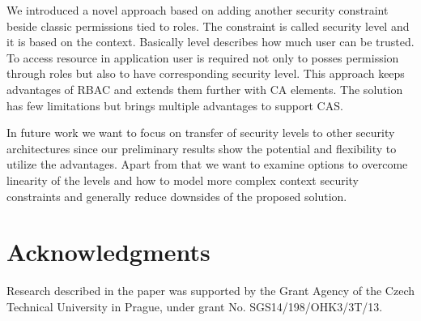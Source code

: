 \documentclass{sig-alternate}
\begin{document}
We introduced a novel approach based on adding another security constraint beside classic permissions tied to roles. The constraint is called security level and it is based on the context. Basically level describes how much user can be trusted. To access resource in application user is required not only to posses permission through roles but also to have corresponding security level. This approach keeps advantages of RBAC and extends them further with CA elements. The solution has few limitations but brings multiple advantages to support CAS. 

In future work we want to focus on transfer of security levels to other security architectures since our preliminary results show the potential and flexibility to utilize the advantages. Apart from that we want to examine options to overcome linearity of the levels and how to model more complex context security constraints and generally reduce downsides of the proposed solution.

\section{Acknowledgments}
Research described in the paper was supported by the
Grant Agency of the Czech Technical University in Prague, under grant No. SGS14/198/OHK3/3T/13.

%

%
%
\end{document}
